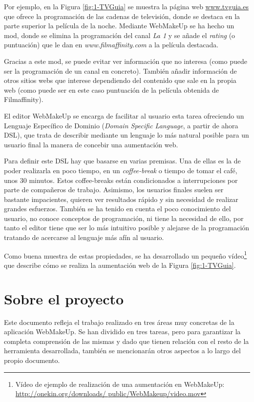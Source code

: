 Por ejemplo, en la Figura \ref{fig:1-TVGuia} se muestra la página web \url{www.tvguia.es} que ofrece la programación de las cadenas de televisión, donde se destaca en la parte superior la película de la noche. Mediante WebMakeUp se ha hecho un mod, donde se elimina la programación del canal \emph{La 1} y se añade el \emph{rating} (o puntuación) que le dan en \emph{www.filmaffinity.com} a la película destacada.

Gracias a este mod, se puede evitar ver información que no interesa (como puede ser la programación de un canal en concreto). También añadir información de otros sitios webs que interese dependiendo del contenido que sale en la propia web (como puede ser en este caso puntuación de la película obtenida de Filmaffinity).

El editor WebMakeUp se encarga de facilitar al usuario esta tarea ofreciendo un Lenguaje Específico de Dominio (\emph{Domain Specific Language}, a partir de ahora DSL), que trata de describir mediante un lenguaje lo más natural posible para un usuario final la manera de concebir una aumentación web.

Para definir este DSL hay que basarse en varias premisas. Una de ellas es la de poder realizarla en poco tiempo, en un \emph{coffee-break} o tiempo de tomar el café, unos 30 minutos. Estos coffee-breaks están condicionados a interrupciones por parte de compañeros de trabajo. Asimismo, los usuarios finales suelen ser bastante impacientes, quieren ver resultados rápido y sin necesidad de realizar grandes esfuerzos. También se ha tenido en cuenta el poco conocimiento del usuario, no conoce conceptos de programación, ni tiene la necesidad de ello, por tanto el editor tiene que ser lo más intuitivo posible y alejarse de la programación tratando de acercarse al lenguaje más afín al usuario.

Como buena muestra de estas propiedades, se ha desarrollado un pequeño vídeo\footnote{Vídeo de ejemplo de realización de una aumentación en WebMakeUp: \url{http://onekin.org/downloads/
public/WebMakeup/video.mov}} que describe cómo se realiza la aumentación web de la Figura \ref{fig:1-TVGuia}.

\section{Sobre el proyecto}
\label{sec:SobreProyecto}

Este documento refleja el trabajo realizado en tres áreas muy concretas de la aplicación WebMakeUp. Se han dividido en tres tareas, pero para garantizar la completa comprensión de las mismas y dado que tienen relación con el resto de la herramienta desarrollada, también se mencionarán otros aspectos a lo largo del propio documento.


